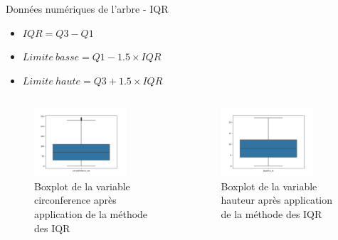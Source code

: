 \documentclass{beamer}
\begin{document}
\begin{frame}{Données numériques de l'arbre - IQR}
	
	\begin{itemize}
		\item $IQR = Q3 - Q1$
		\item $Limite\:basse = Q1 - 1.5 \times IQR$
		\item $Limite\:haute = Q3 + 1.5 \times IQR$
	\end{itemize}
	\begin{columns}
	\begin{column}{0.5\textwidth}
		\begin{figure}
			\includegraphics[width=0.8\textwidth,keepaspectratio]{ressources/boxplot_outliers_circ.png}
			\caption{Boxplot de la variable circonference après application de la méthode des IQR}
		\end{figure}
	\end{column}
	\begin{column}{0.5\textwidth}
		\begin{figure}
			\includegraphics[width=0.8\textwidth,keepaspectratio]{ressources/boxplot_outliers_hau.png}
			\caption{Boxplot de la variable hauteur après application de la méthode des IQR}
		\end{figure}
	\end{column}
	\end{columns}
\end{frame}
\end{document}

